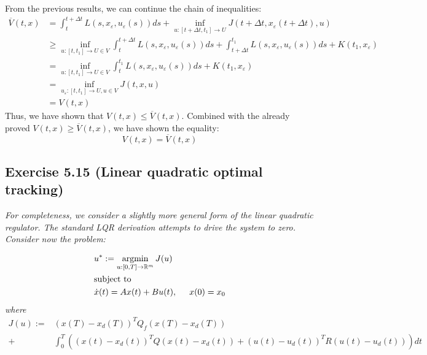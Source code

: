 From the previous results, we can continue the chain of inequalities:
\begin{align}
    \overline{V}(t,x) &= \int_t^{t + \Delta t} L(s, x_{\varepsilon}, u_\varepsilon(s))ds + \inf_{u:[t + \Delta t, t_1] \to U } J(t+ \Delta t, x_\varepsilon (t + \Delta t), u)\\
    &\geq \inf_{u:[t, t_1] \to U \in V} \int_t^{t + \Delta t} L(s, x_{\varepsilon}, u_\varepsilon(s))ds + \int_{t+\Delta t}^{t_1} L(s, x_{\varepsilon}, u_\varepsilon(s))ds + K(t_1, x_{\varepsilon})\\
    &= \inf_{u:[t, t_1] \to U \in V} \int_t^{t_1} L(s, x_{\varepsilon}, u_\varepsilon(s))ds + K(t_1, x_{\varepsilon})\\
    &= \inf_{u_\varepsilon:[t, t_1] \to U, u \in V} J(t, x, u)\\
    &= V(t, x)
\end{align}
Thus, we have shown that $V(t,x) \leq \overline{V}(t,x)$. Combined with the already proved $V(t,x) \geq \overline{V}(t,x)$, we have shown the equality:
\begin{equation}
    V(t,x) = \overline{V}(t,x)
\end{equation}
\QEDB

\subsection{Exercise 5.15 (Linear quadratic optimal tracking)}
\emph{For completeness, we consider a slightly more general form of the linear quadratic regulator. The standard LQR derivation attempts to drive the system to zero. Consider now the problem:}

\begin{align}
    &u^* := \operatorname*{argmin}_{u:[0,T] \to \mathbb{R}^m} J(u) \\
    &\text{subject to}\\
    &\Dot{x}(t) = Ax(t) + Bu(t), \hspace{0.5cm} x(0)=x_0
\end{align}
\emph{where}
\begin{equation}
    \begin{split}
        J(u) := &(x(T) - x_d (T)) ^T Q_f (x(T) - x_d (T) )  \\ 
        + &\int_0^T \left( (x(t) - x_d(t)) ^T Q(x(t) - x_d(t)) + (u(t) - u_d(t)) ^T R(u(t) - u_d(t)) \right) dt
    \end{split}
\end{equation}


